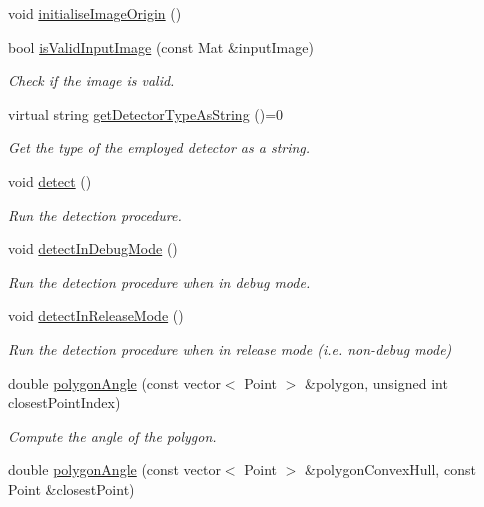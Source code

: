 \begin{DoxyCompactItemize}
void \hyperlink{classmultiscale_1_1analysis_1_1Detector_a0d5677f992e9d9272eb70c08b86e9338}{initialise\-Image\-Origin} ()
\item 
bool \hyperlink{classmultiscale_1_1analysis_1_1Detector_ad0473d0ad9988c84ae88c9cf6adf19be}{is\-Valid\-Input\-Image} (const Mat \&input\-Image)
\begin{DoxyCompactList}\small\item\em Check if the image is valid. \end{DoxyCompactList}\item 
virtual string \hyperlink{classmultiscale_1_1analysis_1_1Detector_aeb7667ac14f48b58fd4601b11f09cc68}{get\-Detector\-Type\-As\-String} ()=0
\begin{DoxyCompactList}\small\item\em Get the type of the employed detector as a string. \end{DoxyCompactList}\item 
void \hyperlink{classmultiscale_1_1analysis_1_1Detector_ae0c0a72fef22d6521e82c18424a4dd04}{detect} ()
\begin{DoxyCompactList}\small\item\em Run the detection procedure. \end{DoxyCompactList}\item 
void \hyperlink{classmultiscale_1_1analysis_1_1Detector_aa9173a243a85e2d9cf493a641fb610aa}{detect\-In\-Debug\-Mode} ()
\begin{DoxyCompactList}\small\item\em Run the detection procedure when in debug mode. \end{DoxyCompactList}\item 
void \hyperlink{classmultiscale_1_1analysis_1_1Detector_a58665776f1a12659dae08d1a4a01050a}{detect\-In\-Release\-Mode} ()
\begin{DoxyCompactList}\small\item\em Run the detection procedure when in release mode (i.\-e. non-\/debug mode) \end{DoxyCompactList}\item 
double \hyperlink{classmultiscale_1_1analysis_1_1Detector_ada30f980ed5ce2f975bb827c393b8cd0}{polygon\-Angle} (const vector$<$ Point $>$ \&polygon, unsigned int closest\-Point\-Index)
\begin{DoxyCompactList}\small\item\em Compute the angle of the polygon. \end{DoxyCompactList}\item 
double \hyperlink{classmultiscale_1_1analysis_1_1Detector_a80dd82a52bdc63bee7f94d4c8403a785}{polygon\-Angle} (const vector$<$ Point $>$ \&polygon\-Convex\-Hull, const Point \&closest\-Point)

\end{DoxyCompactItemize}

